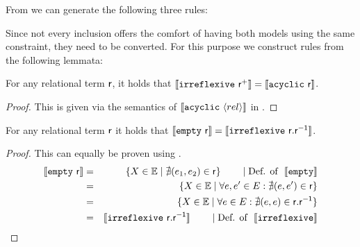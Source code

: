 \documentclass[a4paper,twoside,12pt, english]{article}
\begin{document}
\pagebreak
\noindent From  we can generate the following three rules:

Since not every inclusion offers the comfort of having both models using the same constraint, they need to be converted. For this purpose we construct rules from the following lemmata:

\begin{lemma}\label{lem:irracy}
For any relational term $\textsf{\upshape r}$, it holds that $\llbracket \mathtt{irreflexive}~ \textsf{\upshape r}^+ \rrbracket = \llbracket \mathtt{acyclic}~ \textsf{\upshape r} \rrbracket$.
\end{lemma}
\begin{proof}
This is given via the semantics of $\llbracket \mathtt{acyclic}~ \langle rel \rangle \rrbracket$ in .
\end{proof}

\begin{lemma}\label{lem:emptyirr}
For any relational term $\textsf{\upshape r}$ it holds that $\llbracket \mathtt{empty}~ \sf r \rrbracket = \llbracket \mathtt{irreflexive}~ \sf r.r^{-1} \rrbracket$.
\end{lemma}
\begin{proof} This can equally be proven using .
\begin{eqnarray*}
\llbracket \texttt{empty}~ \sf r \rrbracket &=& \{X \in \mathbb{E} \mid \nexists (e_1,e_2) \in \sf r\} \qquad \mid \text{Def. of }~ \llbracket \texttt{empty} \rrbracket \\
&=& \{X \in \mathbb{E} \mid \forall e,e' \in E: \nexists (e,e') \in \sf r\} \\
&= & \{X \in \mathbb{E} \mid \forall e \in E: \nexists (e,e) \in \sf r.r^{-1} \} \\
&=& \llbracket \texttt{irreflexive}~ \sf r.r^{-1} \rrbracket \qquad \mid \text{Def. of }~ \llbracket \texttt{irreflexive} \rrbracket
\end{eqnarray*}
\end{proof}
\end{document}
